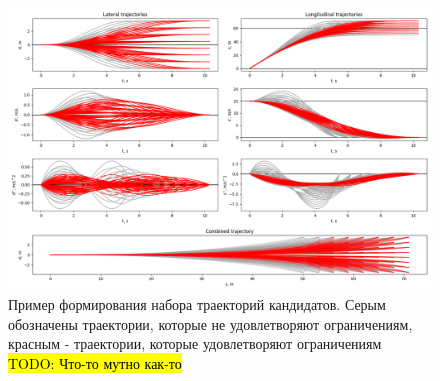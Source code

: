 \begin{figure}[h]
      \centering
      \includegraphics[width=\linewidth]{images/quintic_results_1}
      \caption{Пример формирования набора траекторий кандидатов. Серым обозначены траектории, которые не удовлетворяют
      ограничениям, красным - траектории, которые удовлетворяют ограничениям \hl{TODO: Что-то мутно как-то}}
      \label{img:quintic_results_1}
\end{figure}


